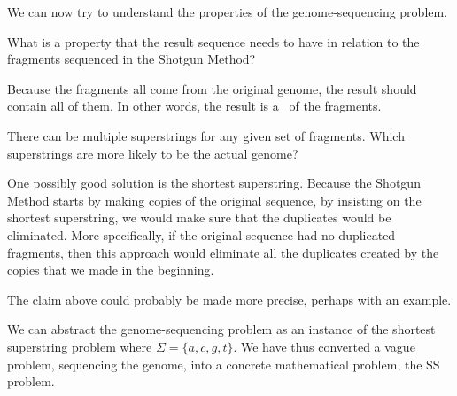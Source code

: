 \begin{gram} 
We can now try to understand the properties of the genome-sequencing
problem.
\end{gram}

\begin{flex}
\begin{exercise}
What is a property that the result sequence needs to have in relation
to the fragments sequenced in the Shotgun Method?
\end{exercise}

\begin{solution}
Because the fragments all come from the original genome, the result
should contain all of them.  In other words, the result is
a~ of the fragments.
%
\end{solution}
\end{flex}

\begin{flex}
\begin{exercise}
There can be multiple superstrings for any given set of fragments.
%
Which superstrings are more likely to be the actual genome?
%
\end{exercise}

\begin{solution}
One possibly good solution is the shortest superstring. 
%
Because the Shotgun Method starts by making copies of the original
sequence, by insisting on the shortest superstring, we would make sure
that the duplicates would be eliminated.
%
More specifically, if the original sequence had no duplicated
fragments, then this approach would eliminate all the duplicates
created by the copies that we made in the beginning.
%
%
\end{solution}
\end{flex}

\begin{teachnote}
The claim above could probably be made more precise, perhaps with an
example.
\end{teachnote}



\begin{gram}
We can abstract the genome-sequencing problem as an instance of the
shortest superstring problem where $\Sigma = \{a, c, g, t\}$.
%
We have thus converted a vague problem, sequencing the genome, into a
concrete mathematical problem, the SS problem. 
%
\end{gram}


